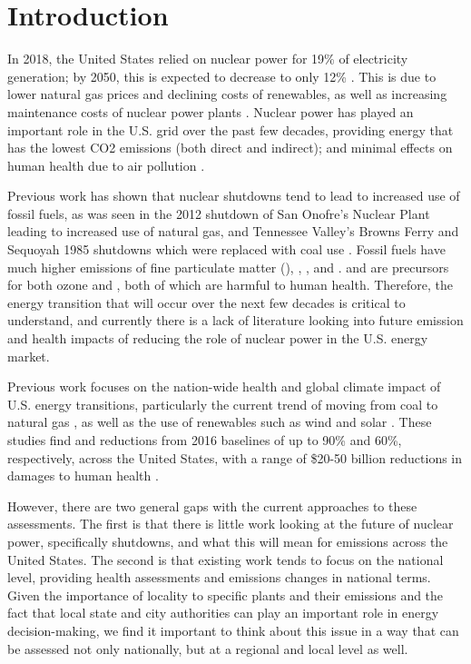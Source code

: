 \documentclass[12]{article}
\begin{document}
\setlength{\leftskip}{0cm}
\setlength{\rightskip}{0cm}

\section{Introduction}
In 2018, the United States relied on nuclear power for 19\% of electricity generation; by 2050, this is expected to decrease to only 12\% \citep{eia_annual_2020}. This is due to lower natural gas prices and declining costs of renewables, as well as increasing maintenance costs of nuclear power plants \citep{davis_market_2016}. Nuclear power has played an important role in the U.S. grid over the past few decades, providing energy that has the lowest CO2 emissions (both direct and indirect); and minimal effects on human health due to air pollution \citep{markandya_electricity_2007}. 

Previous work has shown that nuclear shutdowns tend to lead to increased use of fossil fuels, as was seen in the 2012 shutdown of San Onofre’s Nuclear Plant leading to increased use of natural gas, and Tennessee Valley’s Browns Ferry and Sequoyah 1985 shutdowns which were replaced with coal use \citep{davis_market_2016,severnini_impacts_2017}. Fossil fuels have much higher emissions of fine particulate matter (), , , and .  and  are precursors for both ozone and , both of which are harmful to human health. Therefore, the energy transition that will occur over the next few decades is critical to understand, and currently there is a lack of literature looking into future emission and health impacts of reducing the role of nuclear power in the U.S. energy market. 

Previous work focuses on the nation-wide health and global climate impact of U.S. energy transitions, particularly the current trend of moving from coal to natural gas \citep{lueken_climate_2016, zhang_climate_2016}, as well as the use of renewables such as wind and solar \citep{millstein_climate_2017}. These studies find  and  reductions from 2016 baselines of up to 90\% and 60\%, respectively, across the United States, with a range of \$20-50 billion reductions in damages to human health \citep{lueken_climate_2016}. 

However, there are two general gaps with the current approaches to these assessments. The first is that there is little work looking at the future of nuclear power, specifically shutdowns, and what this will mean for emissions across the United States. The second is that existing work tends to focus on the national level, providing health assessments and emissions changes in national terms. Given the importance of locality to specific plants and their emissions and the fact that local state and city authorities can play an important role in energy decision-making, we find it important to think about this issue in a way that can be assessed not only nationally, but at a regional and local level as well. 
\end{document}

